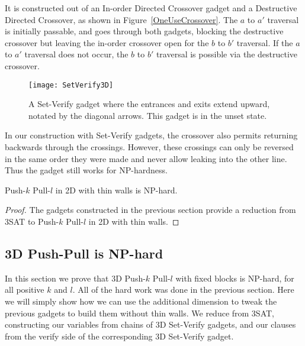 It is constructed out of an In-order Directed Crossover gadget and a Destructive Directed Crossover, as shown in Figure~\ref{OneUseCrossover}. The $a$ to $a'$ traversal is initially passable, and goes through both gadgets,
blocking the destructive crossover but leaving the in-order crossover open for the $b$ to $b'$ traversal. If the $a$ to $a'$ traversal does not occur, the $b$ to $b'$ traversal is possible via the destructive crossover.


\begin{wrapfigure}{hr}{0.45\textwidth}
  \centering
    \texttt{[image: SetVerify3D]}
    \caption{A Set-Verify gadget where the entrances and exits extend upward, notated by the diagonal arrows. This gadget is in the unset state.}
    \label{3DSetVerify}
    \vspace{-7mm}
\end{wrapfigure}


In our construction with Set-Verify gadgets, the crossover also permits returning backwards through the crossings. However, these crossings can only be reversed in the same order they were made and never allow leaking into the other line. Thus the gadget still works for NP-hardness.
%


\begin{theorem}
\label{thm:2DNPhard}
Push-$k$ Pull-$l$ in 2D with thin walls is NP-hard.
\end{theorem}
\begin{proof}
The gadgets constructed in the previous section provide a reduction from 3SAT to Push-$k$ Pull-$l$ in 2D with thin walls.
\end{proof}


\subsection{3D Push-Pull is NP-hard}
\label{3DNPhard}
In this section we prove that 3D Push-$k$ Pull-$l$ with fixed blocks is NP-hard, for all positive $k$ and $l$. All of the hard work was done in the previous section. Here we will simply show how we can use the additional dimension to tweak the previous gadgets to build them without thin walls. We reduce from 3SAT, constructing our variables from chains of 3D Set-Verify gadgets, and our clauses from the verify side of the corresponding 3D Set-Verify gadget.

